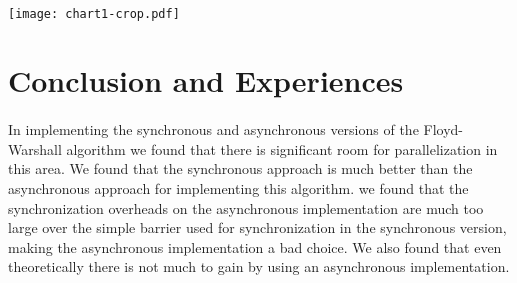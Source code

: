 \documentclass[12pt]{article}
\begin{document}
	\paragraph{}
	\texttt{[image: chart1-crop.pdf]}
	
	\section{Conclusion and Experiences}
	
	\paragraph{}
	In implementing the synchronous and asynchronous versions of the Floyd-Warshall algorithm we found that there is significant room for parallelization in this area. We found that the synchronous approach is much better than the asynchronous approach for implementing this algorithm. we found that the synchronization overheads on the asynchronous implementation are much too large over the simple barrier used for synchronization in the synchronous version, making the asynchronous implementation a bad choice. We also found that even theoretically there is not much to gain by using an asynchronous implementation.
	
\end{document}
